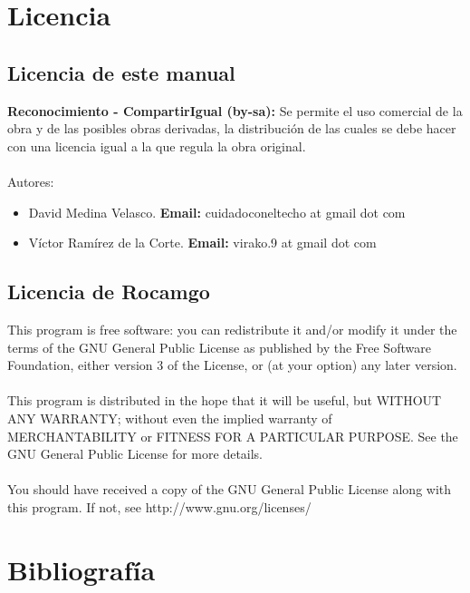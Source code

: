 \documentclass[12pt,a4paper]{report}
\begin{document}
\chapter{Licencia}

\section{Licencia de este manual}

\textbf{Reconocimiento - CompartirIgual (by-sa):} Se permite el uso comercial de
la obra y de las posibles obras derivadas, la distribución de las cuales se debe
hacer con una licencia igual a la que regula la obra original. \\ \\


Autores: 
\begin{itemize} 
    \item David Medina Velasco. \textbf{Email:} cuidadoconeltecho at gmail dot com 
    \item Víctor Ramírez de la Corte. \textbf{Email:} virako.9 at gmail dot com 
\end{itemize}

\section{Licencia de Rocamgo}

This program is free software: you can redistribute it and/or modify it under
the terms of the GNU General Public License as published by the Free Software
Foundation, either version 3 of the License, or (at your option) any later
version. \\ \\ This program is distributed in the hope that it will be useful,
but WITHOUT ANY WARRANTY; without even the implied warranty of MERCHANTABILITY
or FITNESS FOR A PARTICULAR PURPOSE.  See the GNU General Public License for
more details. \\ \\ You should have received a copy of the GNU General Public
License along with this program.  If not, see http://www.gnu.org/licenses/



\chapter{Bibliografía}
\end{document}
